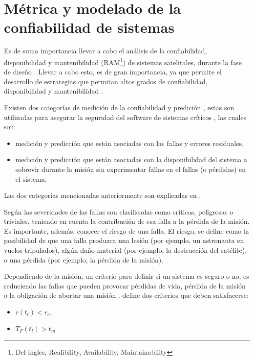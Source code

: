 \section{Métrica y modelado de la confiabilidad de sistemas}
Es de suma importancia llevar a cabo el análisis de la confiabilidad, disponibilidad y mantenibilidad (RAM\footnote{Del ingles, Realibility, Availability, Maintainability}) de sistemas satelitales, durante la fase de diseño \citep{Hoque15}. Llevar a cabo esto, es de gran importancia, ya que permite el desarrollo de estrategias que permitan altos grados de confiabilidad, disponibilidad y mantenibilidad \citep{Hoque15}.

Existen dos categorías de medición de la confiabilidad y predición \citep{Schneidewind97}, estas son utilizadas para asegurar la seguridad del software de sistemas críticos \citep{Schneidewind97}, las cuales son:
  \begin{itemize}
    \item medición y predicción que están asociadas con las fallas y errores residuales.
    \item medición y predicción que están asociadas con la disponibilidad del sistema a sobrevir durante la misión sin experimentar fallas en el fallas (o pérdidas) en el sistema.
  \end{itemize}

  Las dos categorías mencionadas anteriormente son explicadas en \cite{Schneidewind97}.

  Según \cite{Liu14} las severidades de las fallas son clasificadas como críticas, peligrosas o triviales, teniendo en cuenta la contribución de esa falla a la pérdida de la misión. Es importante, además, conocer el riesgo de una falla. El riesgo, se define como la posibilidad de que una falla produzca una lesión (por ejemplo, un astronauta en vuelos tripulados), algún daño material (por ejemplo, la destrucción del satélite), o una pérdida (por ejemplo, la pérdida de la misión).

  Dependiendo de la misión, un criterio para definir si un sistema es seguro o no, es reduciendo las fallas que pueden provocar pérdidas de vida, pérdida de la misión o la obligación de abortar una misión \citep{Schneidewind97}. \cite{Schneidewind97} define dos criterios que deben satisfacerse:
  \begin{itemize}
    \item $r(t_t) < r_c$,
    \item $T_F(t_t) > t_m$
  \end{itemize}

